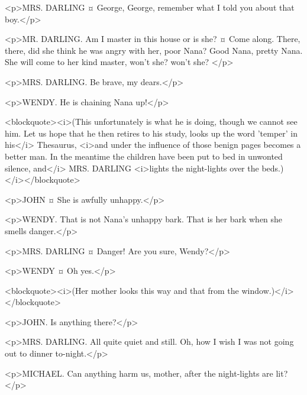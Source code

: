 <p>MRS. DARLING ¤
George, George, remember what I told you about that boy.</p>

<p>MR. DARLING. Am I master in this house or is she?
¤
Come along.
There, there, did she think he was angry with her, poor Nana?
Good Nana, pretty Nana.
She will come to her kind master, won't she? won't she?
</p>

<p>MRS. DARLING. Be brave, my dears.</p>

<p>WENDY. He is chaining Nana up!</p>

<blockquote><i>(This unfortunately is what he is doing, though we cannot see him. Let us hope that he then retires to his study, looks up the word 'temper' in his</i> Thesaurus, <i>and under the influence of those benign pages becomes a better man. In the meantime the children have been put to bed in unwonted silence, and</i> MRS. DARLING <i>lights the night-lights over the beds.)</i></blockquote>

<p>JOHN ¤
She is awfully unhappy.</p>

<p>WENDY. That is not Nana's unhappy bark. That is her bark when she smells danger.</p>

<p>MRS. DARLING ¤
Danger! Are you sure, Wendy?</p>

<p>WENDY ¤
Oh yes.</p>

<blockquote><i>(Her mother looks this way and that from the window.)</i></blockquote>

<p>JOHN. Is anything there?</p>

<p>MRS. DARLING. All quite quiet and still. Oh, how I wish I was not going out to dinner to-night.</p>

<p>MICHAEL. Can anything harm us, mother, after the night-lights are lit?</p>

